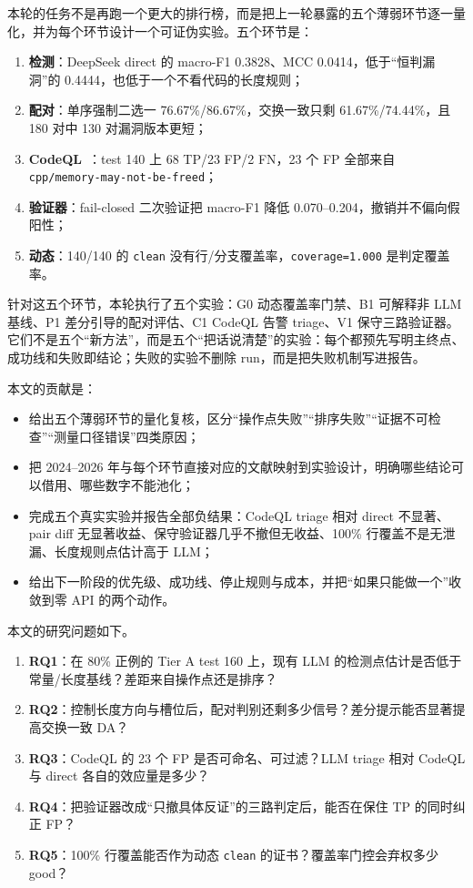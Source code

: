 \documentclass[conference]{IEEEtran}
\begin{document}
本轮的任务不是再跑一个更大的排行榜，而是把上一轮暴露的五个薄弱环节逐一量化，并为每个环节设计一个可证伪实验。五个环节是：
\begin{enumerate}
  \item \textbf{检测}：DeepSeek direct 的 macro-F1 0.3828、MCC 0.0414，低于“恒判漏洞”的 0.4444，也低于一个不看代码的长度规则；
  \item \textbf{配对}：单序强制二选一 76.67\%/86.67\%，交换一致只剩 61.67\%/74.44\%，且 180 对中 130 对漏洞版本更短；
  \item \textbf{CodeQL}~\cite{codeqldocs}：test 140 上 68 TP/23 FP/2 FN，23 个 FP 全部来自 \texttt{cpp/memory-may-not-be-freed}；
  \item \textbf{验证器}：fail-closed 二次验证把 macro-F1 降低 0.070--0.204，撤销并不偏向假阳性；
  \item \textbf{动态}：140/140 的 \texttt{clean} 没有行/分支覆盖率，\texttt{coverage=1.000} 是判定覆盖率。
\end{enumerate}

针对这五个环节，本轮执行了五个实验：G0 动态覆盖率门禁、B1 可解释非 LLM 基线、P1 差分引导的配对评估、C1 CodeQL 告警 triage、V1 保守三路验证器。它们不是五个“新方法”，而是五个“把话说清楚”的实验：每个都预先写明主终点、成功线和失败即结论；失败的实验不删除 run，而是把失败机制写进报告。

本文的贡献是：
\begin{itemize}
  \item 给出五个薄弱环节的量化复核，区分“操作点失败”“排序失败”“证据不可检查”“测量口径错误”四类原因；
  \item 把 2024--2026 年与每个环节直接对应的文献映射到实验设计，明确哪些结论可以借用、哪些数字不能池化；
  \item 完成五个真实实验并报告全部负结果：CodeQL triage 相对 direct 不显著、pair diff 无显著收益、保守验证器几乎不撤但无收益、100\% 行覆盖不是无泄漏、长度规则点估计高于 LLM；
  \item 给出下一阶段的优先级、成功线、停止规则与成本，并把“如果只能做一个”收敛到零 API 的两个动作。
\end{itemize}

本文的研究问题如下。
\begin{enumerate}
  \item \textbf{RQ1}：在 80\% 正例的 Tier A test 160 上，现有 LLM 的检测点估计是否低于常量/长度基线？差距来自操作点还是排序？
  \item \textbf{RQ2}：控制长度方向与槽位后，配对判别还剩多少信号？差分提示能否显著提高交换一致 DA？
  \item \textbf{RQ3}：CodeQL 的 23 个 FP 是否可命名、可过滤？LLM triage 相对 CodeQL 与 direct 各自的效应量是多少？
  \item \textbf{RQ4}：把验证器改成“只撤具体反证”的三路判定后，能否在保住 TP 的同时纠正 FP？
  \item \textbf{RQ5}：100\% 行覆盖能否作为动态 \texttt{clean} 的证书？覆盖率门控会弃权多少 good？
\end{enumerate}
\end{document}
